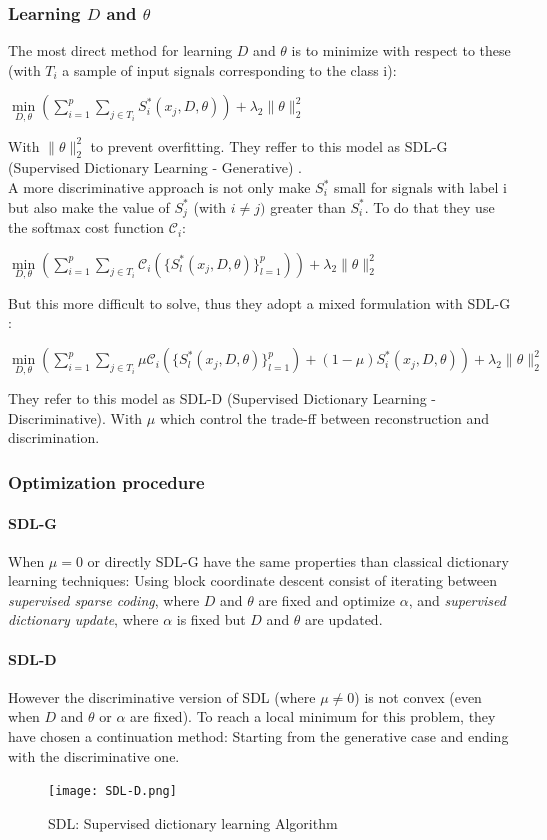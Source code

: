 \documentclass[a4paper,10pt]{article}
\begin{document}
\subsubsection{Learning $D$ and $\theta$}
The most direct method for learning $D$ and $\theta$ is to minimize with respect to these (with $T_i$ a sample of input signals corresponding to the class i):
\begin{center}
 $\underset{D,\theta}{\min}(\sum_{i=1}^p \sum_{j \in T_i}S^*_i(x_j,D,\theta))+ \lambda_2 \|\theta\|^2_2$
\end{center}
With  $ \|\theta\|^2_2$ to prevent overfitting. They reffer to this model as SDL-G (Supervised Dictionary Learning - Generative) \cite{mairal:inria-00322431}.\\
A more discriminative approach is not only make $S^*_i$ small for signals with label i but also make the value of $S^*_j$ (with $i \neq j)$ greater than $S^*_i$. To do that they use the softmax cost function $\mathcal{C}_i$:
\begin{center}
  $\underset{D,\theta}{\min}(\sum_{i=1}^p \sum_{j \in T_i} \mathcal{C}_i(\{ S^*_l(x_j,D,\theta)\}^{p}_{l=1}))+ \lambda_2 \|\theta\|^2_2$
\end{center}
But this more difficult to solve, thus they adopt a mixed formulation with SDL-G :
\begin{center}
   $\underset{D,\theta}{\min}(\sum_{i=1}^p \sum_{j \in T_i} \mu \mathcal{C}_i(\{ S^*_l(x_j,D,\theta)\}^{p}_{l=1}) + (1-\mu)S^*_i(x_j,D,\theta))+ \lambda_2 \|\theta\|^2_2$
\end{center}
They refer to this model as SDL-D (Supervised Dictionary Learning - Discriminative). With $\mu$ which control the trade-ff between reconstruction and discrimination.

\subsubsection{Optimization  procedure}
\paragraph{SDL-G}
When $\mu = 0$ or directly SDL-G have the same properties than classical dictionary learning techniques: Using block coordinate descent  consist of iterating between \textit{supervised sparse coding}, where $D$ and $\theta$ are fixed and optimize $\alpha$, and \textit{supervised dictionary update}, where  $\alpha$ is fixed but $D$ and $\theta$ are updated.
\paragraph{SDL-D} However the discriminative version of SDL (where $\mu \neq 0$) is not convex (even when $D$ and $\theta$ or $\alpha$ are fixed). To reach a local minimum for this problem, they have chosen a continuation method: Starting from the generative case and ending with the discriminative one.
\begin{figure}[h]
 \centering
 \texttt{[image: SDL-D.png]}
 \caption{SDL: Supervised dictionary learning Algorithm  \cite{mairal:inria-00322431}}
\end{figure}
\end{document}
